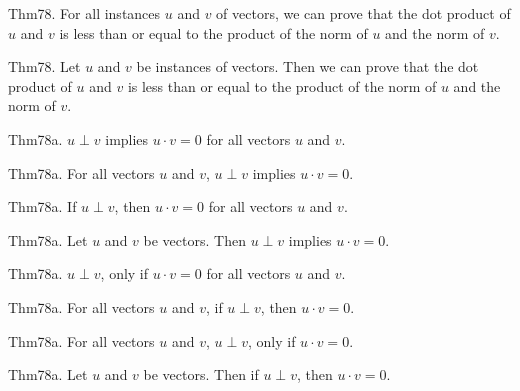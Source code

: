 \documentclass{article}
\begin{document}
Thm78. For all instances $u$ and $v$ of vectors, we can prove that the dot product of $u$ and $v$ is less than or equal to the product of the norm of $u$ and the norm of $v$.

Thm78. Let $u$ and $v$ be instances of vectors. Then we can prove that the dot product of $u$ and $v$ is less than or equal to the product of the norm of $u$ and the norm of $v$.

Thm78a. $u \perp v$ implies $u \cdot v = 0$ for all vectors $u$ and $v$.

Thm78a. For all vectors $u$ and $v$, $u \perp v$ implies $u \cdot v = 0$.

Thm78a. If $u \perp v$, then $u \cdot v = 0$ for all vectors $u$ and $v$.

Thm78a. Let $u$ and $v$ be vectors. Then $u \perp v$ implies $u \cdot v = 0$.

Thm78a. $u \perp v$, only if $u \cdot v = 0$ for all vectors $u$ and $v$.

Thm78a. For all vectors $u$ and $v$, if $u \perp v$, then $u \cdot v = 0$.

Thm78a. For all vectors $u$ and $v$, $u \perp v$, only if $u \cdot v = 0$.

Thm78a. Let $u$ and $v$ be vectors. Then if $u \perp v$, then $u \cdot v = 0$.
\end{document}
